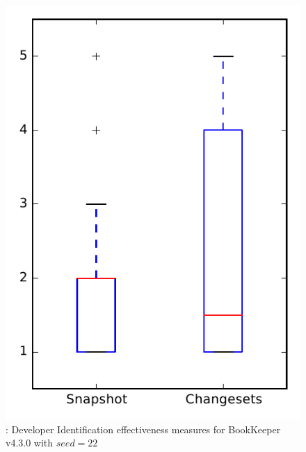 
\begin{figure}
\centering
\includegraphics[height=0.4\textheight]{figures/dit_seed/rq1_bookkeeper_22}
\caption{\rtwo: Developer Identification effectiveness measures for BookKeeper v4.3.0 with $seed=22$}
\label{fig:dit_seed:rq1:bookkeeper}
\end{figure}

